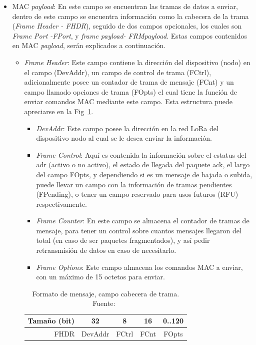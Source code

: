 \begin{justify}
\begin{itemize}
\item MAC \textit{payload}: En este campo se encuentran las tramas de datos a enviar, dentro de este campo se encuentra información como la cabecera de la trama (\textit{Frame Header - FHDR}), seguido de dos campos opcionales, los cuales son \textit{Frame Port -FPort}, y \textit{frame payload- FRMpayload}. Estas campos contenidos en MAC \textit{payload}, serán explicados a continuación.
\begin{itemize}
\item \textit{Frame Header}: Este campo contiene la dirección del dispositivo (nodo) en el campo (DevAddr), un campo de control de trama (FCtrl), adicionalmente posee un contador de trama de mensaje (FCnt) y un campo llamado opciones de trama (FOpts) el cual tiene la función de enviar comandos MAC mediante este campo. Esta estructura puede apreciarse en la Fig~\ref{msg:2}.\\
\begin{itemize}
\item \textit{DevAddr}: Este campo posee la dirección en la red LoRa del dispositivo nodo al cual se le desea enviar la información.
\item \textit{Frame Control}: Aquí es contenida la información sobre el estatus del \gls{adr} (activo o no activo), el estado de llegada del paquete \gls{ack}, el largo del campo FOpts, y dependiendo si es un mensaje de bajada o subida, puede llevar un campo con la información de tramas pendientes (FPending), o tener un campo reservado para usos futuros (RFU) respectivamente.
\item \textit{Frame Counter}: En este campo se almacena el contador de tramas de mensaje, para tener un control sobre cuantos mensajes llegaron del total (en caso de ser paquetes fragmentados), y así pedir retransmisión de datos en caso de necesitarlo.
\item \textit{Frame Options}: Este campo almacena los comandos MAC a enviar, con un máximo de 15 octetos para enviar.
\end{itemize}

\begin{table}[!ht]
\centering
\begin{tabular}{|r|c|c|c|c|}
\hline
Tamaño (bit) & 32 & 8 & 16 & 0..120 \\\hline
FHDR & DevAddr & FCtrl & FCnt & FOpts\\\hline
\end{tabular}
\caption{Formato de mensaje, campo cabecera de trama. Fuente:~\cite{Sornin}}
\label{msg:2}
\end{table}


\end{itemize}
\end{itemize}
\end{justify}
